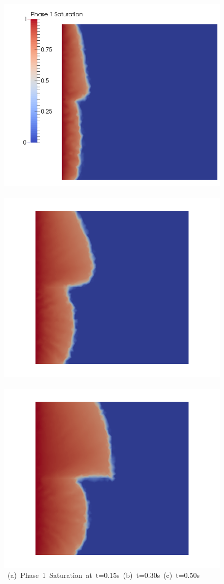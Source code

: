 \begin{landscape}
\begin{figure}[ht] 
\vbox{\vspace{-1cm}
\hspace{0.0cm} \hbox{\includegraphics[width=.56\textwidth]{./Pics/BaseCase/BaseCase_Saturation_t_dot15.png}
      \includegraphics[width=.56\textwidth]{./Pics/BaseCase/BaseCase_Saturation_t_dot30.png}
      \includegraphics[width=.56\textwidth]{./Pics/BaseCase/BaseCase_Saturation_t_dot50.png}}
\vspace{0.cm}
\hbox{\hspace{0.5cm} (a) Phase 1 Saturation at t=0.15s \hspace{3.75cm} (b) t=0.30s \hspace{5.0cm} (c) t=0.50s}
}
\end{figure}
\end{landscape}
